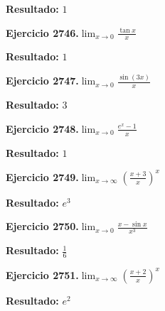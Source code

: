 \documentclass[10pt,a4paper]{article}
\begin{document}
\begin{solbox}
\textbf{Resultado:} \(\displaystyle 1\)
\end{solbox}

\begin{ejbox}
\textbf{Ejercicio 2746.}\quad $\lim_{x\to 0} \frac{\tan x}{x}$
\end{ejbox}

\begin{solbox}
\textbf{Resultado:} \(\displaystyle 1\)
\end{solbox}

\begin{ejbox}
\textbf{Ejercicio 2747.}\quad $\lim_{x\to 0} \frac{\sin(3x)}{x}$
\end{ejbox}

\begin{solbox}
\textbf{Resultado:} \(\displaystyle 3\)
\end{solbox}

\newpage
\begin{ejbox}
\textbf{Ejercicio 2748.}\quad $\lim_{x\to 0} \frac{e^x-1}{x}$
\end{ejbox}

\begin{solbox}
\textbf{Resultado:} \(\displaystyle 1\)
\end{solbox}

\begin{ejbox}
\textbf{Ejercicio 2749.}\quad $\lim_{x\to \infty} \left(\frac{x+3}{x}\right)^{x}$
\end{ejbox}

\begin{solbox}
\textbf{Resultado:} \(\displaystyle e^{3}\)
\end{solbox}

\begin{ejbox}
\textbf{Ejercicio 2750.}\quad $\lim_{x\to 0} \frac{x-\sin x}{x^3}$
\end{ejbox}

\begin{solbox}
\textbf{Resultado:} \(\displaystyle \frac{1}{6}\)
\end{solbox}

\newpage
\begin{ejbox}
\textbf{Ejercicio 2751.}\quad $\lim_{x\to \infty} \left(\frac{x+2}{x}\right)^{x}$
\end{ejbox}

\begin{solbox}
\textbf{Resultado:} \(\displaystyle e^{2}\)
\end{solbox}
\end{document}
